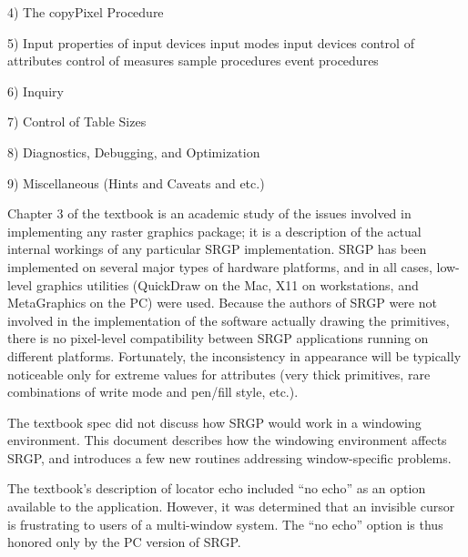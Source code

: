 \newdisplay

\item{4)} The copyPixel Procedure

\newdisplay

\item{5)} Input
 properties of input devices
 input modes
 input devices
 control of attributes
 control of measures
 sample procedures
 event procedures

\newdisplay

\item{6)} Inquiry

\newdisplay

\item{7)} Control of Table Sizes

\newdisplay

\item{8)} Diagnostics, Debugging, and Optimization

\newdisplay

\item{9)} Miscellaneous (Hints and Caveats and etc.)


Chapter 3 of the textbook is an academic study of the issues involved in
implementing any raster graphics package; it is  a description of the
actual internal workings of any particular SRGP implementation.  SRGP has been
implemented on several major types of hardware platforms, and in all cases,
low-level graphics utilities (QuickDraw on the Mac, X11 on workstations, and
MetaGraphics on the PC) were used.  Because the authors of SRGP were not
involved in the implementation of the software actually drawing the primitives,
there is no pixel-level compatibility between SRGP applications running on
different platforms.  Fortunately, the inconsistency in appearance will be
typically noticeable only for extreme values for attributes (very thick
primitives, rare combinations of write mode and pen/fill style, etc.).

\newpar
The textbook spec did not discuss how SRGP would work in a windowing
environment.  This document describes how the windowing environment affects
SRGP, and introduces a few new routines addressing window-specific problems.

\newpar
The textbook's description of locator echo included ``no echo'' as an option
available to the application.  However, it was determined that an invisible
cursor is frustrating to users of a multi-window system.
The ``no echo'' option is thus honored only by the PC version of SRGP.

